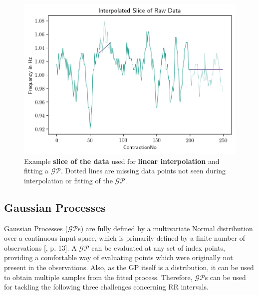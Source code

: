 \documentclass[11pt]{scrartcl}
\begin{document}
\begin{figure}[hbt]
	\center
	\includegraphics[width=1.0\textwidth]{img/general/slice_raw_data_linear_spline_interpolation.png}
	\caption{Example \textcolor{viridis5}{\textbf{slice of the data}} used for \textcolor{viridis0}{\textbf{linear interpolation}} and fitting a $\mathcal{GP}$. Dotted lines are missing data points not seen during interpolation or fitting of the $\mathcal{GP}$.}
	\label{fig:slice_raw_data_linear_spline_interpolation.png}
\end{figure}

\FloatBarrier
\subsection{Gaussian Processes}

Gaussian Processes ($\mathcal{GP}$s) are fully defined by a multivariate Normal distribution over a continuous input space, which is primarily defined by a finite number of observations [\cite{10.5555/1162254}, p. 13]. A $\mathcal{GP}$ can be evaluated at any set of index points, providing a comfortable way of evaluating points which were originally not present in the observations. Also, as the GP itself is a distribution, it can be used to obtain multiple samples from the fitted process. Therefore, $\mathcal{GP}$s can be used for tackling the following three challenges concerning RR intervals.
\end{document}
